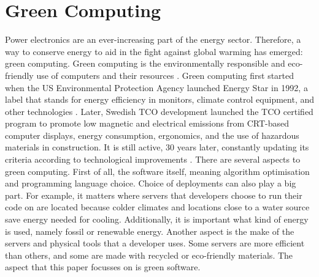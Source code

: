 \chapter{Green Computing}

Power electronics are an ever-increasing part of the energy sector. Therefore, a way to conserve energy to aid in the fight against global warming has emerged: green computing.
Green computing is the environmentally responsible and eco-friendly use of computers and their resources \cite{Salama20}. Green computing first started when the US Environmental Protection Agency launched Energy Star in 1992, a label that stands for energy efficiency in monitors, climate control equipment, and other technologies \cite{ENERGYSTAR}.
Later, Swedish TCO development launched the TCO certified program to promote low magnetic and electrical emissions from CRT-based computer displays, energy consumption, ergonomics, and the use of hazardous materials in construction. It is still active, 30 years later, constantly updating its criteria according to technological improvements \cite{TCOCertified}.
There are several aspects to green computing. First of all, the software itself, meaning algorithm optimisation and programming language choice. Choice of deployments can also play a big part. For example, it matters where servers that developers choose to run their code on are located because colder climates and locations close to a water source save energy needed for cooling. Additionally, it is important what kind of energy is used, namely fossil or renewable energy. Another aspect is the make of the servers and physical tools that a developer uses. Some servers are more efficient than others, and some are made with recycled or eco-friendly materials.
The aspect that this paper focusses on is green software.

